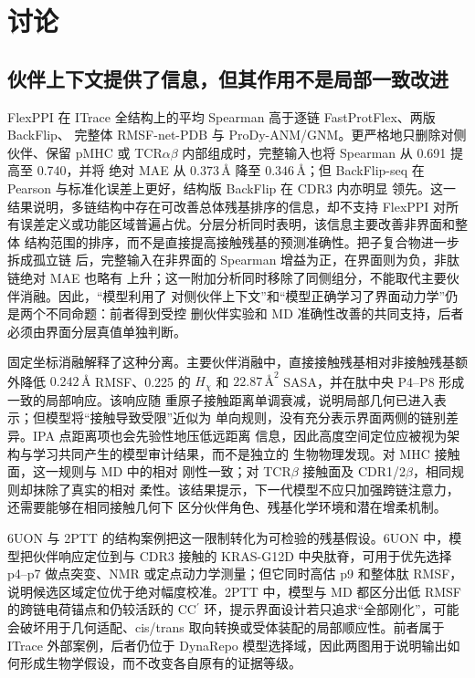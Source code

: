 
\section{讨论}

\subsection{伙伴上下文提供了信息，但其作用不是局部一致改进}

FlexPPI 在 ITrace 全结构上的平均 Spearman 高于逐链 FastProtFlex、两版 BackFlip、
完整体 RMSF-net-PDB 与 ProDy-ANM/GNM。更严格地只删除对侧伙伴、保留 pMHC 或
TCR$\alpha\beta$ 内部组成时，完整输入也将 Spearman 从 0.691 提高至 0.740，并将
绝对 MAE 从 $0.373\,\text{\AA}$ 降至 $0.346\,\text{\AA}$；但
BackFlip-seq 在 Pearson 与标准化误差上更好，结构版 BackFlip 在 CDR3 内亦明显
领先。这一结果说明，多链结构中存在可改善总体残基排序的信息，却不支持 FlexPPI
对所有误差定义或功能区域普遍占优。分层分析同时表明，该信息主要改善非界面和整体
结构范围的排序，而不是直接提高接触残基的预测准确性。把子复合物进一步拆成孤立链
后，完整输入在非界面的 Spearman 增益为正，在界面则为负，非肽链绝对 MAE 也略有
上升；这一附加分析同时移除了同侧组分，不能取代主要伙伴消融。因此，“模型利用了
对侧伙伴上下文”和“模型正确学习了界面动力学”仍是两个不同命题：前者得到受控
删伙伴实验和 MD 准确性改善的共同支持，后者必须由界面分层真值单独判断。

固定坐标消融解释了这种分离。主要伙伴消融中，直接接触残基相对非接触残基额外降低
$0.242\,\text{\AA}$ RMSF、0.225 的 $H_\chi$ 和
$22.87\,\text{\AA}^2$ SASA，并在肽中央 P4--P8 形成一致的局部响应。该响应随
重原子接触距离单调衰减，说明局部几何已进入表示；但模型将“接触导致受限”近似为
单向规则，没有充分表示界面两侧的链别差异。IPA 点距离项也会先验性地压低远距离
信息，因此高度空间定位应被视为架构与学习共同产生的模型审计结果，而不是独立的
生物物理发现。对 MHC 接触面，这一规则与 MD 中的相对
刚性一致；对 TCR$\beta$ 接触面及 CDR1/2$\beta$，相同规则却抹除了真实的相对
柔性。该结果提示，下一代模型不应只加强跨链注意力，还需要能够在相同接触几何下
区分伙伴角色、残基化学环境和潜在增柔机制。

6UON 与 2PTT 的结构案例把这一限制转化为可检验的残基假设。6UON 中，模型把伙伴响应定位到与 CDR3 接触的 KRAS-G12D 中央肽脊，可用于优先选择 p4--p7 做点突变、NMR 或定点动力学测量；但它同时高估 p9 和整体肽 RMSF，说明候选区域定位优于绝对幅度校准。2PTT 中，模型与 MD 都区分出低 RMSF 的跨链电荷锚点和仍较活跃的 CC$^\prime$ 环，提示界面设计若只追求“全部刚化”，可能会破坏用于几何适配、cis/trans 取向转换或受体装配的局部顺应性。前者属于 ITrace 外部案例，后者仍位于 DynaRepo 模型选择域，因此两图用于说明输出如何形成生物学假设，而不改变各自原有的证据等级。

